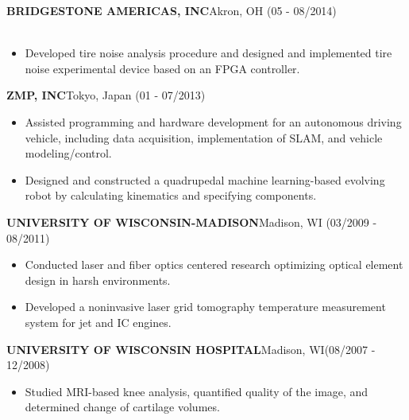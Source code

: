 \documentclass[10pt,letterpaper]{article}
\begin{document}
  \MakeUppercase{\bf Bridgestone Americas, Inc}\hfill{Akron, OH}{ (05 - 08/2014)}\\
  \\
  \begin{itemize}
  \item Developed tire noise analysis procedure and designed and implemented tire noise experimental device based on an FPGA controller.
  \end{itemize}

  \MakeUppercase{\bf ZMP, Inc}\hfill{Tokyo, Japan }{(01 - 07/2013)}\\
  \begin{itemize}
  \item Assisted programming and hardware development for an autonomous driving vehicle, including data acquisition, implementation of SLAM, and vehicle modeling/control.
  \item Designed and constructed a quadrupedal machine learning-based evolving robot by calculating kinematics and specifying components.
  \end{itemize}

  \MakeUppercase{\bf University of Wisconsin-Madison}\hfill{Madison, WI}{ (03/2009 - 08/2011)}\\
  \begin{itemize}
  \item Conducted laser and fiber optics centered research optimizing optical element design in harsh environments.
  \item Developed a noninvasive laser grid tomography temperature measurement system for jet and IC engines.
  \end{itemize}

  \MakeUppercase{\bf University of Wisconsin Hospital}\hfill{Madison, WI}{ {(08/2007 - 12/2008)}}\\
  \begin{itemize}
  \item Studied MRI-based knee analysis, quantified quality of the image, and determined change of cartilage volumes.
  \end{itemize}
\end{document}
